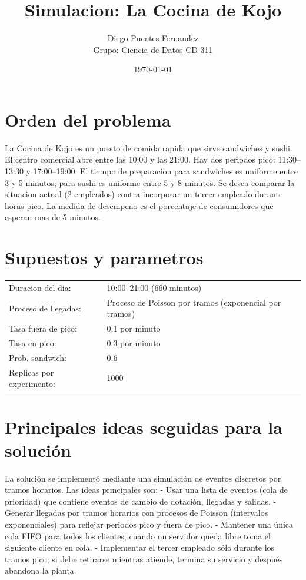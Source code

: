 \documentclass[11pt]{article}
\begin{document}
\title{Simulacion: La Cocina de Kojo}
\author{Diego Puentes Fernandez \\ Grupo: Ciencia de Datos CD-311}
\date{\today}
\maketitle

\section*{Orden del problema}
La Cocina de Kojo es un puesto de comida rapida que sirve sandwiches y sushi. El centro comercial abre entre las 10:00 y las 21:00. Hay dos periodos pico: 11:30--13:30 y 17:00--19:00. El tiempo de preparacion para sandwiches es uniforme entre 3 y 5 minutos; para sushi es uniforme entre 5 y 8 minutos. Se desea comparar la situacion actual (2 empleados) contra incorporar un tercer empleado durante horas pico. La medida de desempeno es el porcentaje de consumidores que esperan mas de 5 minutos.

\section*{Supuestos y parametros}
\begin{tabular}{ll}
Duracion del dia: & 10:00--21:00 (660 minutos) \\ 
Proceso de llegadas: & Proceso de Poisson por tramos (exponencial por tramos) \\ 
Tasa fuera de pico: & 0.1 por minuto \\ 
Tasa en pico: & 0.3 por minuto \\ 
Prob. sandwich: & 0.6 \\ 
Replicas por experimento: & 1000 \\ 
\end{tabular}

\section*{Principales ideas seguidas para la solución}
La solución se implementó mediante una simulación de eventos discretos por tramos horarios. Las ideas principales son:
- Usar una lista de eventos (cola de prioridad) que contiene eventos de cambio de dotación, llegadas y salidas.
- Generar llegadas por tramos horarios con procesos de Poisson (intervalos exponenciales) para reflejar periodos pico y fuera de pico.
- Mantener una única cola FIFO para todos los clientes; cuando un servidor queda libre toma el siguiente cliente en cola.
- Implementar el tercer empleado sólo durante los tramos pico; si debe retirarse mientras atiende, termina su servicio y después abandona la planta.
\end{document}
